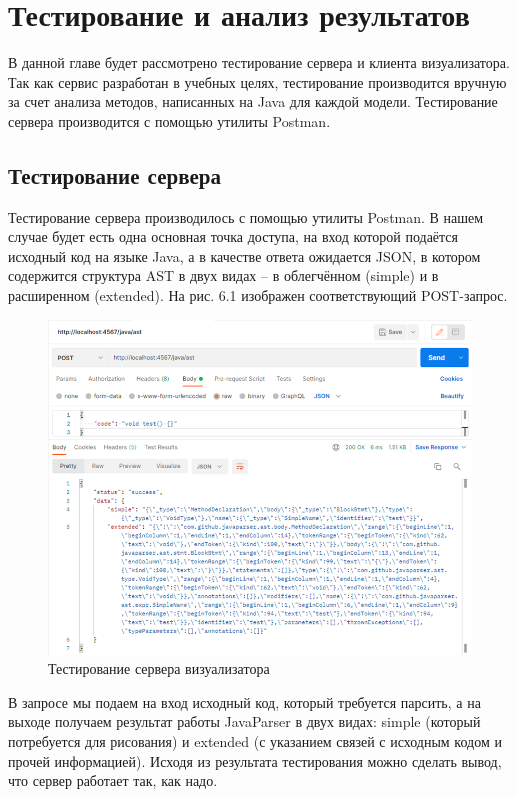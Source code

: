 \chapter{Тестирование и анализ результатов} \label{ch6}
В данной главе будет рассмотрено тестирование сервера и клиента визуализатора. Так как сервис разработан в учебных целях, тестирование производится вручную за счет анализа методов, написанных на Java для каждой модели. Тестирование сервера производится с помощью утилиты Postman.
\section{Тестирование сервера} \label{ch6:sec1}
Тестирование сервера производилось с помощью утилиты Postman. В нашем случае будет есть одна основная точка доступа, на вход которой подаётся исходный код на языке Java, а в качестве ответа ожидается JSON, в котором содержится структура AST в двух видах – в облегчённом (simple) и в расширенном (extended). На рис. 6.1 изображен соответствующий POST-запрос.

\begin{figure}[h]
	\center
	\includegraphics [scale=0.65] {my_folder/images/my/20}
	\caption{Тестирование сервера визуализатора} 
	\label{fig:20}  
\end{figure}

В запросе мы подаем на вход исходный код, который требуется парсить, а на выходе получаем результат работы JavaParser в двух видах: simple (который потребуется для рисования) и extended (с указанием связей с исходным кодом и прочей информацией). Исходя из результата тестирования можно сделать вывод, что сервер работает так, как надо.
